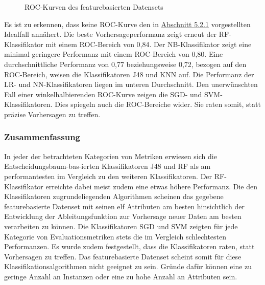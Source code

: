\begin{figure}[ht]
  \caption{ROC-Kurven des featurebasierten Datensets \label{fig:roc-feat}}
\end{figure}

Es ist zu erkennen, dass keine ROC-Kurve den in \hyperref[roc-def]{Abschnitt 5.2.1} vorgestellten Idealfall annähert. Die beste Vorhersageperformanz zeigt erneut der RF-Klassifikator mit einem ROC-Bereich von 0,84. Der NB-Klassifikator zeigt eine minimal geringere Performanz mit einem ROC-Bereich von 0,80. Eine durchschnittliche Performanz von 0,77 beziehungsweise 0,72, bezogen auf den ROC-Bereich, weisen die Klassifikatoren J48 und KNN auf. Die Performanz der LR- und NN-Klassifikatoren liegen im unteren Durchschnitt. Den unerwünschten Fall einer winkelhalbierenden ROC-Kurve zeigen die SGD- und SVM-Klassifikatoren. Dies spiegeln auch die ROC-Bereiche wider. Sie \glqq raten\grqq{} somit, statt präzise Vorhersagen zu treffen.

\subsubsection*{Zusammenfassung}
In jeder der betrachteten Kategorien von Metriken erwiesen sich die Entscheidungsbaum-bas-ierten Klassifikatoren J48 und RF als am performantesten im Vergleich zu den weiteren Klassifikatoren. Der RF-Klassifikator erreichte dabei meist zudem eine etwas höhere Performanz. Die den Klassifikatoren zugrundeliegenden Algorithmen scheinen das gegebene featurebasierte Datenset mit seinen elf Attributen am besten hinsichtlich der Entwicklung der Ableitungsfunktion zur Vorhersage neuer Daten am besten verarbeiten zu können.
Die Klassifikatoren SGD und SVM zeigten für jede Kategorie von Evaluationsmetriken stets die im Vergleich schlechtesten Performanzen. Es wurde zudem festgestellt, dass die Klassifikatoren raten, statt Vorhersagen zu treffen. Das featurebasierte Datenset scheint somit für diese Klassifikationsalgorithmen nicht geeignet zu sein. Gründe dafür können eine zu geringe Anzahl an Instanzen oder eine zu hohe Anzahl an Attributen sein.

